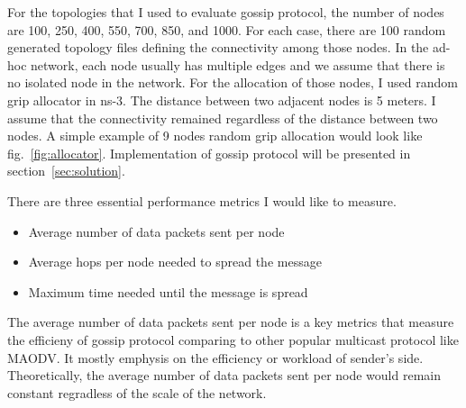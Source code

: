For the topologies that I used to evaluate gossip protocol, the number of nodes are 100, 250, 400, 550, 700, 850, and 1000. For each case, there are 100 random generated topology files defining the connectivity among those nodes. In the ad-hoc network, each node usually has multiple edges and we assume that there is no isolated node in the network. For the allocation of those nodes, I used random grip allocator in ns-3. The distance between two adjacent nodes is 5 meters. I assume that the connectivity remained regardless of the distance between two nodes. A simple example of 9 nodes random grip allocation would look like fig.~\ref{fig:allocator}. Implementation of gossip protocol will be presented in section~\ref{sec:solution}. 




There are three essential performance metrics I would like to measure. 

\begin{itemize}
	\item Average number of data packets sent per node
	\item Average hops per node needed to spread the message
	\item Maximum time needed until the message is spread
\end{itemize}

The average number of data packets sent per node is a key metrics that measure the efficieny of gossip protocol comparing to other popular multicast protocol like MAODV. It mostly emphysis on the efficiency or workload of sender's side. Theoretically, the average number of data packets sent per node would remain constant regradless of the scale of the network. 

